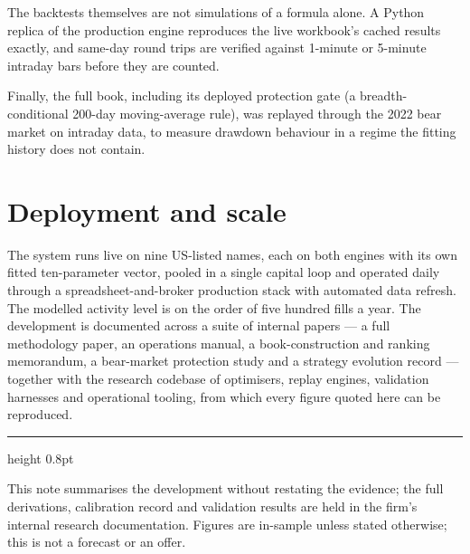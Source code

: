 \documentclass[11pt,a4paper]{article}
\begin{document}
The backtests themselves are not simulations of a formula alone. A Python
replica of the production engine reproduces the live workbook's cached
results exactly, and same-day round trips are verified against 1-minute or
5-minute intraday bars before they are counted.

Finally, the full book, including its deployed protection gate (a
breadth-conditional 200-day moving-average rule), was replayed through the
2022 bear market on intraday data, to measure drawdown behaviour in a regime
the fitting history does not contain.

\section{Deployment and scale}

The system runs live on nine US-listed names, each on both engines with its
own fitted ten-parameter vector, pooled in a single capital loop and
operated daily through a spreadsheet-and-broker production stack with
automated data refresh. The modelled activity level is on the order of five
hundred fills a year. The development is documented across a suite of
internal papers --- a full methodology paper, an operations manual, a
book-construction and ranking memorandum, a bear-market protection study and
a strategy evolution record --- together with the research codebase of
optimisers, replay engines, validation harnesses and operational tooling,
from which every figure quoted here can be reproduced.

\vspace{0.4cm}
{\color{bcnavy}\hrule height 0.8pt}
\vspace{0.2cm}
{\footnotesize\color{bcgrey} This note summarises the development without
restating the evidence; the full derivations, calibration record and
validation results are held in the firm's internal research documentation.
Figures are in-sample unless stated otherwise; this is not a forecast or an
offer.}
\end{document}
